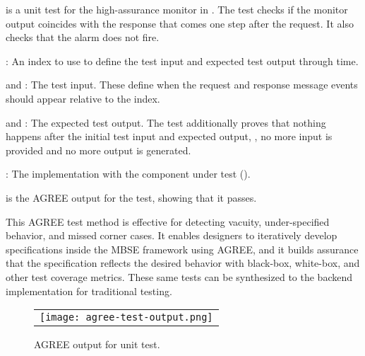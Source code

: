  is a unit test for the high-assurance monitor in .
The test checks if the monitor output coincides with the response that comes one step after the request.
It also checks that the alarm does not fire.
\begin{compactitem}
\item {}: An index to use to define the test input and expected test output through time.
\item {} and : The test input. These define when the request and response message events should appear relative to the index.
\item {} and : The expected test output. 
The test additionally proves that nothing happens after the initial test input and expected output, \ie, no more input is provided and no more output is generated.
\item {}: The implementation with the component under test ().
\end{compactitem}
 is the AGREE output for the test, showing that it passes. 

This AGREE test method is effective for detecting vacuity, under-specified behavior, and missed corner cases.
It enables designers to iteratively develop specifications inside the MBSE framework using AGREE, and it builds assurance that the specification reflects the desired behavior with black-box, white-box, and other test coverage metrics.
These same tests can be synthesized to the backend implementation for traditional testing.

\begin{figure}
  \begin{center}
    \begin{tabular}{c}
      \texttt{[image: agree-test-output.png]} \\
    \end{tabular}
  \end{center}
  \caption{AGREE output for unit test.} 
  \label{fig:test-output}
\end{figure}